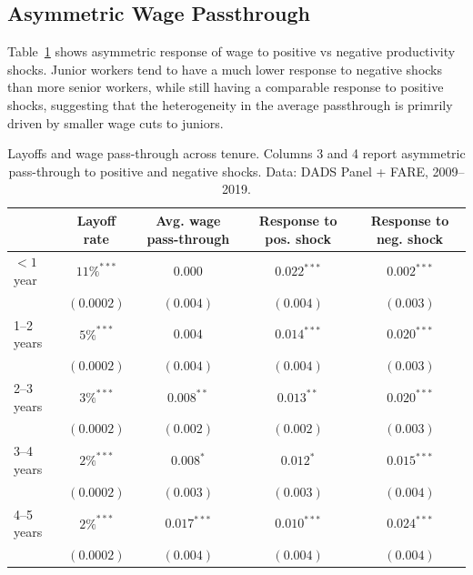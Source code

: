 \subsection{Asymmetric Wage Passthrough} \label{app:asym}
Table~\ref{tab:tenure} shows asymmetric response of wage to positive vs negative productivity shocks. Junior workers tend to have a much lower response to negative shocks than more senior workers, while still having a comparable response to positive shocks, suggesting that the heterogeneity in the average passthrough is primrily driven by smaller wage cuts to juniors.
\begin{table}[h!]
  \centering
  \begin{tabular}{lcccc}
    \hline
    & \multicolumn{1}{c}{Layoff rate} & \multicolumn{1}{c}{Avg. wage pass-through} & \multicolumn{1}{c}{Response to pos. shock} & \multicolumn{1}{c}{Response to neg. shock} \\
    \hline
    $<\!1$ year      &  $11\%^{***}$  &  $0.000$     &  $0.022^{***}$ &  $0.002^{***}$ \\
                     &  $(0.0002)$    &  $(0.004)$   &  $(0.004)$     &  $(0.003)$     \\
    1–2 years        &  $5\%^{***}$   &  $0.004$     &  $0.014^{***}$ &  $0.020^{***}$ \\
                     &  $(0.0002)$    &  $(0.004)$   &  $(0.004)$     &  $(0.003)$     \\
    2–3 years        &  $3\%^{***}$   &  $0.008^{**}$ & $0.013^{**}$  &  $0.020^{***}$ \\
                     &  $(0.0002)$    &  $(0.002)$   &  $(0.002)$     &  $(0.003)$     \\
    3–4 years        &  $2\%^{***}$   &  $0.008^{*}$ &  $0.012^{*}$   &  $0.015^{***}$ \\
                     &  $(0.0002)$    &  $(0.003)$   &  $(0.003)$     &  $(0.004)$     \\
    4–5 years        &  $2\%^{***}$   &  $0.017^{***}$ & $0.010^{***}$ &  $0.024^{***}$ \\
                     &  $(0.0002)$    &  $(0.004)$   &  $(0.004)$     &  $(0.004)$     \\
    \hline
  \end{tabular}
  \caption{Layoffs and wage pass-through across tenure. Columns 3 and 4 report asymmetric pass-through to positive and negative shocks. Data: DADS Panel + FARE, 2009–2019.}
  \label{tab:tenure}
\end{table}

